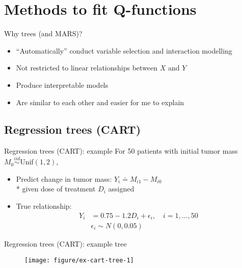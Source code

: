 \documentclass[handout]{beamer}
\begin{document}


\section{Methods to fit Q-functions} %
\label{sec:methods_to_fit_q_functions}

\begin{frame}[c]{Why trees (and MARS)?}
  \begin{itemize}[<+->]
    \item ``Automatically'' conduct variable selection and interaction modelling
    \item Not restricted to linear relationships between $X$ and $Y$
    \item Produce interpretable models 
    \item Are similar to each other and easier for me to explain 
  \end{itemize}
\end{frame}

\subsection{Regression trees (CART)} %
\label{sub:cart}

\begin{frame}{Regression trees (CART): example}
  For 50 patients with initial tumor mass $M_{0} \overset{iid}{\sim} \text{Unif}(1, 2)$,
  \begin{itemize}[<+(1)->]
    \item Predict change in tumor mass: $Y_{i} \doteq M_{i1} - M_{i0}$ \\* given dose of treatment $D_{i}$ assigned
    \item True relationship:
    \begin{align*}
      Y_{i} &= 0.75 - 1.2 D_{i} + \epsilon_{i}, \quad i = 1, \ldots, 50 \\
      & \epsilon_{i} \sim N(0, 0.05)
    \end{align*}
  \end{itemize}
\end{frame}

\begin{frame}[c]{Regression trees (CART): example tree}
  \begin{figure}[!htbp]
  \begin{center}
    \texttt{[image: figure/ex-cart-tree-1]}
  \end{center}
  \end{figure}
\end{frame}
\end{document}
